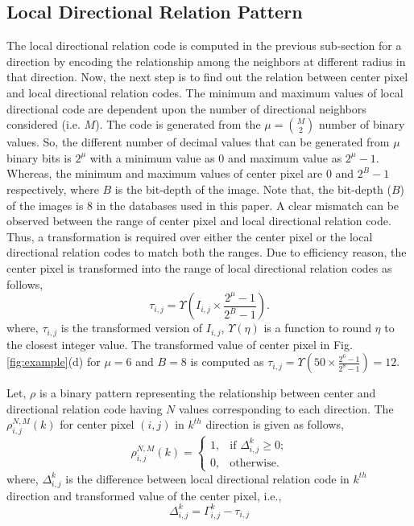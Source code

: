 \documentclass[a4paper]{article}
\begin{document}
\subsection{Local Directional Relation Pattern}
The local directional relation code is computed in the previous sub-section for a direction by encoding the relationship among the neighbors at different radius in that direction. Now, the next step is to find out the relation between center pixel and local directional relation codes. The minimum and maximum values of local directional code are dependent upon the number of directional neighbors considered (i.e. $M$). The code is generated from the $\mu = \binom{M}{2}$ number of binary values. So, the different number of decimal values that can be generated from $\mu$ binary bits is $2^{\mu}$ with a minimum value as $0$ and maximum value as $2^{\mu}-1$. Whereas, the minimum and maximum values of center pixel are $0$ and $2^{B}-1$ respectively, where $B$ is the bit-depth of the image. Note that, the bit-depth ($B$) of the images is 8 in the databases used in this paper. A clear mismatch can be observed between the range of center pixel and local directional relation code. Thus, a transformation is required over either the center pixel or the local directional relation codes to match both the ranges. Due to efficiency reason, the center pixel is transformed into the range of local directional relation codes as follows,
\begin{equation}
\tau_{i,j} = \Upsilon (I_{i,j} \times \frac{2^{\mu}-1}{2^{B}-1}).
\end{equation}
where, $\tau_{i,j}$ is the transformed version of $I_{i,j}$, $\Upsilon(\eta)$ is a function to round $\eta$ to the closest integer value.
The transformed value of center pixel in Fig. \ref{fig:example}(d) for $\mu=6$ and $B=8$ is computed as $\tau_{i,j}=\Upsilon(50 \times \frac{2^6-1}{2^8-1})=12$.

Let, $\rho$ is a binary pattern representing the relationship between center and directional relation code having $N$ values corresponding to each direction. The $\rho_{i,j}^{N,M}(k)$ for center pixel $(i,j)$ in $k^{th}$ direction is given as follows,
\begin{equation}
\rho_{i,j}^{N,M}(k)=
\begin{cases}
1,	&\text{if $\Delta_{i,j}^{k} \geq 0$;}\\
0,	&\text{otherwise.}
\end{cases}
\end{equation}
where, $\Delta_{i,j}^{k}$ is the difference between local directional relation code in $k^{th}$ direction and transformed value of the center pixel, i.e.,
\begin{equation}
\Delta_{i,j}^{k} = \Gamma_{i,j}^{k} - \tau_{i,j} 
\end{equation}
\end{document}
